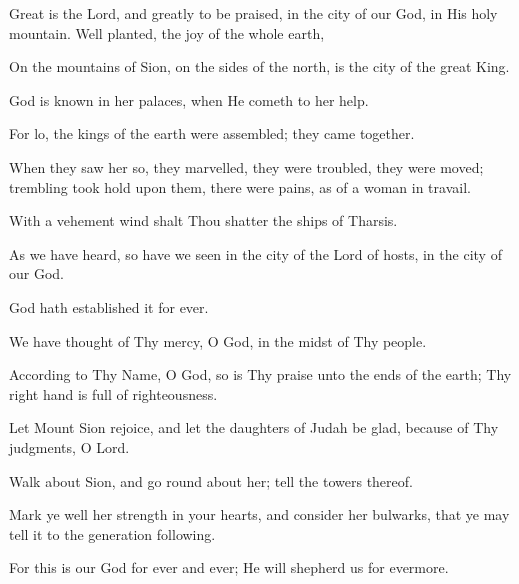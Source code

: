 Great is the Lord, and greatly to be praised, in the city of our God, in His holy mountain. Well planted, the joy of the whole earth,

On the mountains of Sion, on the sides of the north, is the city of the great King.

God is known in her palaces, when He cometh to her help.

For lo, the kings of the earth were assembled; they came together.

When they saw her so, they marvelled, they were troubled, they were moved; trembling took hold upon them, there were pains, as of a woman in travail.

With a vehement wind shalt Thou shatter the ships of Tharsis.

As we have heard, so have we seen in the city of the Lord of hosts, in the city of our God.

God hath established it for ever.

We have thought of Thy mercy, O God, in the midst of Thy people.

According to Thy Name, O God, so is Thy praise unto the ends of the earth; Thy right hand is full of righteousness.

Let Mount Sion rejoice, and let the daughters of Judah be glad, because of Thy judgments, O Lord.

Walk about Sion, and go round about her; tell the towers thereof.

Mark ye well her strength in your hearts, and consider her bulwarks, that ye may tell it to the generation following.

For this is our God for ever and ever; He will shepherd us for evermore.
